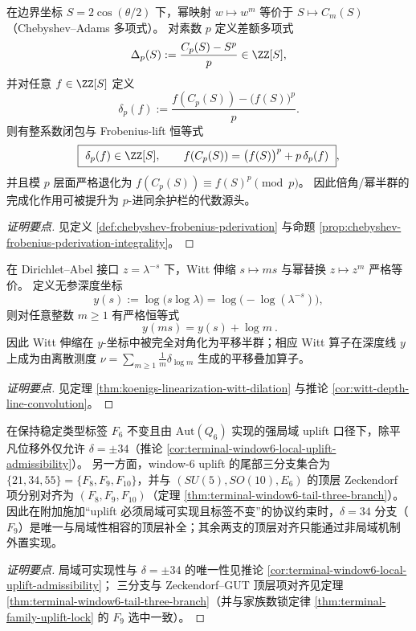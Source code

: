 \begin{conclusion}\label{con:xi-terminal-chebyshev-frobenius-pderivation}
在边界坐标 \(S=2\cos(\theta/2)\) 下，幂映射 \(w\mapsto w^{m}\) 等价于 \(S\mapsto C_m(S)\)（Chebyshev--Adams 多项式）。
对素数 \(p\) 定义差额多项式
\[
\Delta_p(S):=\frac{C_p(S)-S^p}{p}\in\ZZ[S],
\]
并对任意 \(f\in\ZZ[S]\) 定义
\[
\delta_p(f):=\frac{f(C_p(S))-\bigl(f(S)\bigr)^p}{p}.
\]
则有整系数闭包与 Frobenius-lift 恒等式
\[
\boxed{\ \delta_p(f)\in\ZZ[S],\qquad f(C_p(S))=\bigl(f(S)\bigr)^p+p\,\delta_p(f)\ },
\]
并且模 \(p\) 层面严格退化为 \(f(C_p(S))\equiv f(S)^p\pmod p\)。
因此倍角/幂半群的完成化作用可被提升为 \(p\)-进同余护栏的代数源头。
\end{conclusion}
\begin{proof}[证明要点]
见定义 \ref{def:chebyshev-frobenius-pderivation} 与命题 \ref{prop:chebyshev-frobenius-pderivation-integrality}。
\end{proof}

\begin{conclusion}\label{con:xi-terminal-witt-koenigs-logm-translation}
在 Dirichlet--Abel 接口 \(z=\lambda^{-s}\) 下，Witt 伸缩 \(s\mapsto ms\) 与幂替换 \(z\mapsto z^m\) 严格等价。
定义无参深度坐标
\[
y(s):=\log\!\bigl(s\log\lambda\bigr)=\log\!\bigl(-\log(\lambda^{-s})\bigr),
\]
则对任意整数 \(m\ge 1\) 有严格恒等式
\[
\boxed{\ y(ms)=y(s)+\log m\ }.
\]
因此 Witt 伸缩在 \(y\)-坐标中被完全对角化为平移半群；相应 Witt 算子在深度线 \(y\) 上成为由离散测度 \(\nu=\sum_{m\ge 1}\frac{1}{m}\delta_{\log m}\) 生成的平移叠加算子。
\end{conclusion}
\begin{proof}[证明要点]
见定理 \ref{thm:koenigs-linearization-witt-dilation} 与推论 \ref{cor:witt-depth-line-convolution}。
\end{proof}

\begin{conclusion}\label{con:xi-terminal-window6-local-uplift-so10-unique}
在保持稳定类型标签 \(F_6\) 不变且由 \(\mathrm{Aut}(Q_6)\) 实现的强局域 uplift 口径下，除平凡位移外仅允许 \(\delta=\pm 34\)（推论 \ref{cor:terminal-window6-local-uplift-admissibility}）。
另一方面，window-\(6\) uplift 的尾部三分支集合为 \(\{21,34,55\}=\{F_8,F_9,F_{10}\}\)，并与 \((SU(5),SO(10),E_6)\) 的顶层 Zeckendorf 项分别对齐为 \((F_8,F_9,F_{10})\)（定理 \ref{thm:terminal-window6-tail-three-branch}）。
因此在附加施加“uplift 必须局域可实现且标签不变”的协议约束时，\(\delta=34\) 分支（\(F_9\)）是唯一与局域性相容的顶层补全；其余两支的顶层对齐只能通过非局域机制外置实现。
\end{conclusion}
\begin{proof}[证明要点]
局域可实现性与 \(\delta=\pm 34\) 的唯一性见推论 \ref{cor:terminal-window6-local-uplift-admissibility}；
三分支与 Zeckendorf--GUT 顶层项对齐见定理 \ref{thm:terminal-window6-tail-three-branch}（并与家族数锁定律 \ref{thm:terminal-family-uplift-lock} 的 \(F_9\) 选中一致）。
\end{proof}

